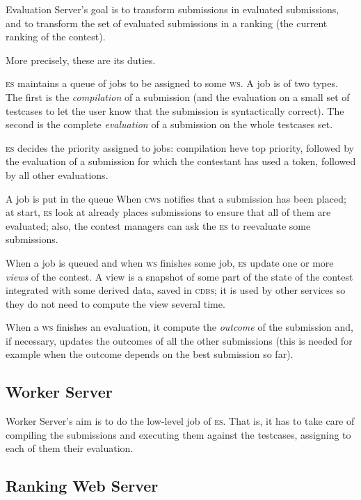 \documentclass[a4paper,8pt]{amsart}
\newcommand{\CDBS}{\textsc{cdbs}}
\newcommand{\CWS}{\textsc{cws}}
\newcommand{\ES}{\textsc{es}}
\newcommand{\WS}{\textsc{ws}}
\newenvironment{squishlist}{%
  \begin{list}{\textbullet}%
    { \setlength{\itemsep}{0pt}%
      \setlength{\parsep}{3pt}%
      \setlength{\topsep}{3pt}%
      \setlength{\partopsep}{0pt}%
      \setlength{\leftmargin}{1.5em}%
      \setlength{\labelwidth}{1em}%
      \setlength{\labelsep}{0.5em} }%
}{\end{list}}
\begin{document}
\begin{multicols}{2}
  Evaluation Server's goal is to transform submissions in evaluated
  submissions, and to transform the set of evaluated submissions in a
  ranking (the current ranking of the contest).

  More precisely, these are its duties.
  \begin{squishlist}
  \item \ES{} maintains a queue of jobs to be assigned to some
    \WS{}. A job is of two types. The first is the
    \emph{compilation\/} of a submission (and the evaluation on a
    small set of testcases to let the user know that the submission is
    syntactically correct). The second is the complete
    \emph{evaluation\/} of a submission on the whole testcases set.
  \item \ES{} decides the priority assigned to jobs: compilation heve
    top priority, followed by the evaluation of a submission for which
    the contestant has used a token, followed by all other
    evaluations.
  \item A job is put in the queue When \CWS{} notifies that a
    submission has been placed; at start, \ES{} look at already places
    submissions to ensure that all of them are evaluated; also, the
    contest managers can ask the \ES{} to reevaluate some submissions.
  \item When a job is queued and when \WS{} finishes some job, \ES{}
    update one or more \emph{views\/} of the contest. A view is a
    snapshot of some part of the state of the contest integrated with
    some derived data, saved in \CDBS{}; it is used by other services
    so they do not need to compute the view several time.
  \item When a \WS{} finishes an evaluation, it compute the
    \emph{outcome\/} of the submission and, if necessary, updates the
    outcomes of all the other submissions (this is needed for example
    when the outcome depends on the best submission so far).
  \end{squishlist}

  \subsection{Worker Server}

  Worker Server's aim is to do the low-level job of \ES{}. That is, it
  has to take care of compiling the submissions and executing them
  against the testcases, assigning to each of them their evaluation.

  \subsection{Ranking Web Server}


\end{multicols}
\end{document}
